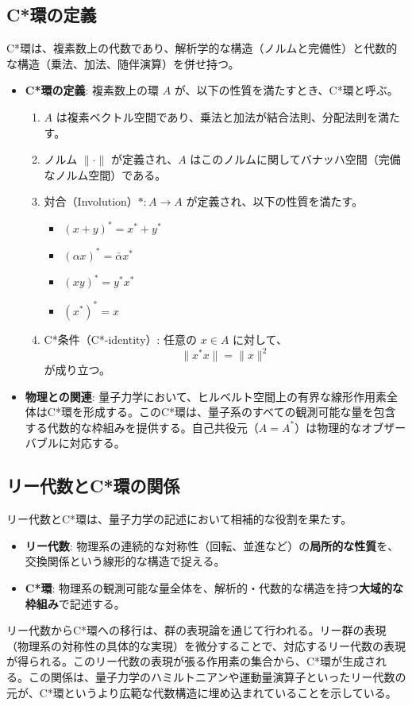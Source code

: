 \documentclass[uplatex,a4j,12pt,dvipdfmx]{jsarticle}
\begin{document}
\subsection{C*環の定義}

C*環は、複素数上の代数であり、解析学的な構造（ノルムと完備性）と代数的な構造（乗法、加法、随伴演算）を併せ持つ。

\begin{itemize}
	\item \textbf{C*環の定義}:
	      複素数上の環 $A$ が、以下の性質を満たすとき、C*環と呼ぶ。
	      \begin{enumerate}
		      \item $A$ は複素ベクトル空間であり、乗法と加法が結合法則、分配法則を満たす。
		      \item ノルム $\|\cdot\|$ が定義され、$A$ はこのノルムに関してバナッハ空間（完備なノルム空間）である。
		      \item 対合（Involution）$*: A \to A$ が定義され、以下の性質を満たす。
		            \begin{itemize}
			            \item $(x+y)^* = x^*+y^*$
			            \item $(\alpha x)^* = \bar{\alpha} x^*$
			            \item $(xy)^* = y^*x^*$
			            \item $(x^*)^* = x$
		            \end{itemize}
		      \item C*条件（C*-identity）: 任意の $x \in A$ に対して、
		            \[
			            \|x^*x\| = \|x\|^2
		            \]
		            が成り立つ。
	      \end{enumerate}
	\item \textbf{物理との関連}:
	      量子力学において、ヒルベルト空間上の有界な線形作用素全体はC*環を形成する。このC*環は、量子系のすべての観測可能な量を包含する代数的な枠組みを提供する。自己共役元（$A=A^*$）は物理的なオブザーバブルに対応する。
\end{itemize}

\subsection{リー代数とC*環の関係}

リー代数とC*環は、量子力学の記述において相補的な役割を果たす。

\begin{itemize}
	\item \textbf{リー代数}: 物理系の連続的な対称性（回転、並進など）の\textbf{局所的な性質}を、交換関係という線形的な構造で捉える。
	\item \textbf{C*環}: 物理系の観測可能な量全体を、解析的・代数的な構造を持つ\textbf{大域的な枠組み}で記述する。
\end{itemize}
リー代数からC*環への移行は、群の表現論を通じて行われる。リー群の表現（物理系の対称性の具体的な実現）を微分することで、対応するリー代数の表現が得られる。このリー代数の表現が張る作用素の集合から、C*環が生成される。この関係は、量子力学のハミルトニアンや運動量演算子といったリー代数の元が、C*環というより広範な代数構造に埋め込まれていることを示している。
\end{document}
